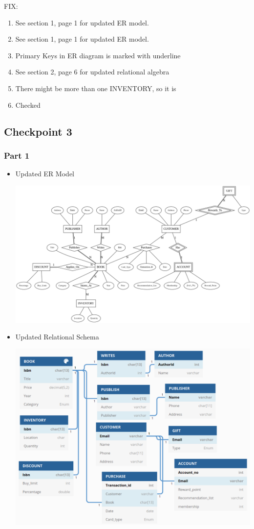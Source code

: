 \documentclass[12pt, letterpaper]{report}
\begin{document}
FIX:
\begin{enumerate}
\item See section 1, page 1 for updated ER model.
\item See section 1, page 1 for updated ER model.
\item Primary Keys in ER diagram is marked with underline
\item See section 2, page 6 for updated relational algebra
\item There might be more than one INVENTORY, so it is
\item Checked
\end{enumerate}

\subsection{Checkpoint 3}

\subsubsection{Part 1}
\begin{itemize}
  \item Updated ER Model

    \includegraphics[width=\linewidth]{Section3/ER3.png}

  \item Updated Relational Schema

    \includegraphics[scale=0.3]{Section3/RS3.png}
\end{itemize}
\end{document}

